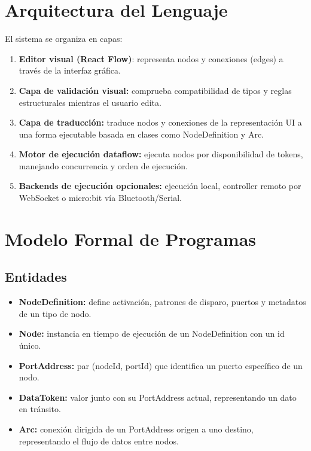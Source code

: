 \label{apx:system-manual}

\section*{Arquitectura del Lenguaje}

El sistema se organiza en capas:

\begin{enumerate}
    \item \textbf{Editor visual (React Flow)}: representa nodos y conexiones (edges) a través de la interfaz gráfica.
    \item \textbf{Capa de validación visual:} comprueba compatibilidad de tipos y reglas estructurales mientras el usuario edita.
    \item \textbf{Capa de traducción: }traduce nodos y conexiones de la representación UI a una forma ejecutable basada en clases como NodeDefinition y Arc.
    \item \textbf{Motor de ejecución dataflow:} ejecuta nodos por disponibilidad de tokens, manejando concurrencia y orden de ejecución.
    \item \textbf{Backends de ejecución opcionales:} ejecución local, controller remoto por WebSocket o micro:bit vía Bluetooth/Serial.
\end{enumerate}

\section*{Modelo Formal de Programas}

\subsection*{Entidades}

\begin{itemize}
    \item \textbf{NodeDefinition:} define activación, patrones de disparo, puertos y metadatos de un tipo de nodo.
    \item \textbf{Node:} instancia en tiempo de ejecución de un NodeDefinition con un id único.
    \item \textbf{PortAddress:} par (nodeId, portId) que identifica un puerto específico de un nodo.
    \item \textbf{DataToken:} valor junto con su PortAddress actual, representando un dato en tránsito.
    \item \textbf{Arc:} conexión dirigida de un PortAddress origen a uno destino, representando el flujo de datos entre nodos.
\end{itemize}

